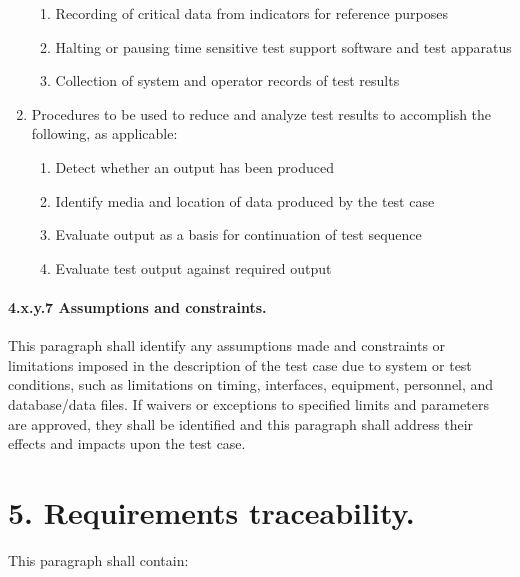 \begin{enumerate}
  \begin{enumerate}
  \itemsep1pt\parskip0pt
  \item
    Recording of critical data from indicators for reference purposes
  \item
    Halting or pausing time sensitive test support software and test
    apparatus
  \item
    Collection of system and operator records of test results
  \end{enumerate}
\item
  Procedures to be used to reduce and analyze test results to accomplish
  the following, as applicable:

  \begin{enumerate}
  \itemsep1pt\parskip0pt
  \item
    Detect whether an output has been produced
  \item
    Identify media and location of data produced by the test case
  \item
    Evaluate output as a basis for continuation of test sequence
  \item
    Evaluate test output against required output
  \end{enumerate}
\end{enumerate}

\paragraph{4.x.y.7 Assumptions and constraints.}

This paragraph shall identify any assumptions made and constraints or
limitations imposed in the description of the test case due to system or
test conditions, such as limitations on timing, interfaces, equipment,
personnel, and database/data files. If waivers or exceptions to
specified limits and parameters are approved, they shall be identified
and this paragraph shall address their effects and impacts upon the test
case.

\section{5. Requirements traceability.}

This paragraph shall contain:

